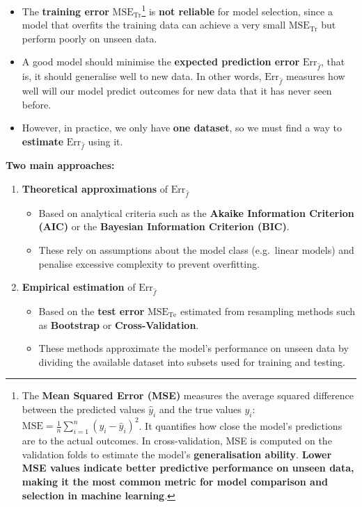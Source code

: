 \documentclass[
  letterpaper,
  DIV=11,
  numbers=noendperiod]{scrartcl}
\providecommand{\tightlist}{%
  \setlength{\itemsep}{0pt}\setlength{\parskip}{0pt}}\usepackage{longtable,booktabs,array}
\begin{document}
\begin{itemize}
\tightlist
\item
  The \textbf{training error} \(\text{MSE}_{\text{Tr}}\)\footnote{The
    \textbf{Mean Squared Error (MSE)} measures the average squared
    difference between the predicted values \(\hat{y}_i\) and the true
    values \(y_i\):
    \(\text{MSE} = \frac{1}{n}\sum_{i=1}^{n}(y_i - \hat{y}_i)^2\). It
    quantifies how close the model's predictions are to the actual
    outcomes. In cross-validation, MSE is computed on the validation
    folds to estimate the model's \textbf{generalisation ability}.
    \textbf{Lower MSE values indicate better predictive performance on
    unseen data, making it the most common metric for model comparison
    and selection in machine learning}.} is \textbf{not reliable} for
  model selection, since a model that overfits the training data can
  achieve a very small \(\text{MSE}_{\text{Tr}}\) but perform poorly on
  unseen data.
\item
  A good model should minimise the \textbf{expected prediction error}
  \(\text{Err}_{\hat{f}}\), that is, it should generalise well to new
  data. In other words, \(\text{Err}_{\hat{f}}\) measures how well will
  our model predict outcomes for new data that it has never seen before.
\item
  However, in practice, we only have \textbf{one dataset}, so we must
  find a way to \textbf{estimate} \(\text{Err}_{\hat{f}}\) using it.
\end{itemize}

\textbf{Two main approaches:}

\begin{enumerate}
\def\labelenumi{\arabic{enumi}.}
\tightlist
\item
  \textbf{Theoretical approximations} of \(\text{Err}_{\hat{f}}\)

  \begin{itemize}
  \tightlist
  \item
    Based on analytical criteria such as the \textbf{Akaike Information
    Criterion (AIC)} or the \textbf{Bayesian Information Criterion
    (BIC)}.
  \item
    These rely on assumptions about the model class (e.g.~linear models)
    and penalise excessive complexity to prevent overfitting.
  \end{itemize}
\item
  \textbf{Empirical estimation} of \(\text{Err}_{\hat{f}}\)

  \begin{itemize}
  \tightlist
  \item
    Based on the \textbf{test error} \(\text{MSE}_{\text{Te}}\)
    estimated from resampling methods such as \textbf{Bootstrap} or
    \textbf{Cross-Validation}.
  \item
    These methods approximate the model's performance on unseen data by
    dividing the available dataset into subsets used for training and
    testing.
  \end{itemize}
\end{enumerate}
\end{document}
